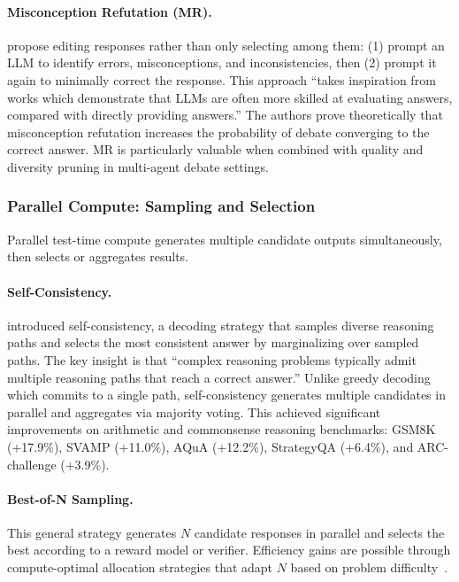 \paragraph{Misconception Refutation (MR).} \citet{estornell2024multillmdebate} propose editing responses rather than only selecting among them: (1) prompt an LLM to identify errors, misconceptions, and inconsistencies, then (2) prompt it again to minimally correct the response. This approach ``takes inspiration from works which demonstrate that LLMs are often more skilled at evaluating answers, compared with directly providing answers.'' The authors prove theoretically that misconception refutation increases the probability of debate converging to the correct answer. MR is particularly valuable when combined with quality and diversity pruning in multi-agent debate settings.

\subsubsection{Parallel Compute: Sampling and Selection}

Parallel test-time compute generates multiple candidate outputs simultaneously, then selects or aggregates results.

\paragraph{Self-Consistency.} \citet{wang2023selfconsistency} introduced self-consistency, a decoding strategy that samples diverse reasoning paths and selects the most consistent answer by marginalizing over sampled paths. The key insight is that ``complex reasoning problems typically admit multiple reasoning paths that reach a correct answer.'' Unlike greedy decoding which commits to a single path, self-consistency generates multiple candidates in parallel and aggregates via majority voting. This achieved significant improvements on arithmetic and commonsense reasoning benchmarks: GSM8K (+17.9\%), SVAMP (+11.0\%), AQuA (+12.2\%), StrategyQA (+6.4\%), and ARC-challenge (+3.9\%).

\paragraph{Best-of-N Sampling.} This general strategy generates $N$ candidate responses in parallel and selects the best according to a reward model or verifier. Efficiency gains are possible through compute-optimal allocation strategies that adapt $N$ based on problem difficulty~\citep{snell2024scalingllmtesttimecompute}.

